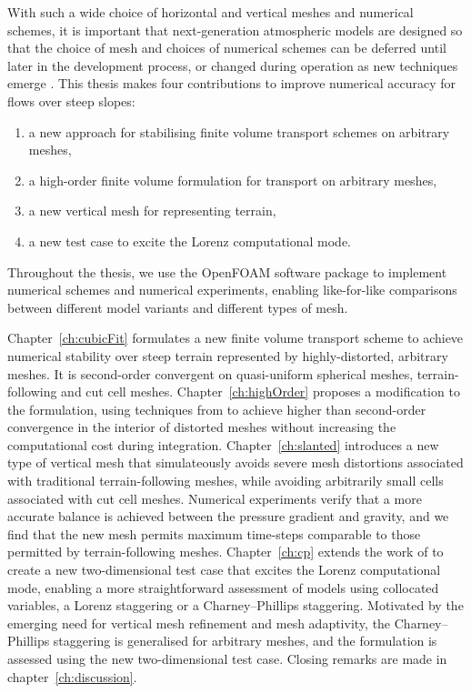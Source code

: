 With such a wide choice of horizontal and vertical meshes and numerical schemes, it is important that next-generation atmospheric models are designed so that the choice of mesh and choices of numerical schemes can be deferred until later in the development process, or changed during operation as new techniques emerge \citep{ford2013, theurich2016}.
This thesis makes four contributions to improve numerical accuracy for flows over steep slopes:
\begin{enumerate}
\item a new approach for stabilising finite volume transport schemes on arbitrary meshes,
\item a high-order finite volume formulation for transport on arbitrary meshes,
\item a new vertical mesh for representing terrain,
\item a new test case to excite the Lorenz computational mode.
\end{enumerate}
Throughout the thesis, we use the OpenFOAM software package  to implement numerical schemes and numerical experiments, enabling like-for-like comparisons between different model variants and different types of mesh.

Chapter~\ref{ch:cubicFit} formulates a new finite volume transport scheme to achieve numerical stability over steep terrain represented by highly-distorted, arbitrary meshes.
It is second-order convergent on quasi-uniform spherical meshes, terrain-following and cut cell meshes.
Chapter~\ref{ch:highOrder} proposes a modification to the formulation, using techniques from \citet{devendran2017}  to achieve higher than second-order convergence in the interior of distorted meshes without increasing the computational cost during integration.
Chapter~\ref{ch:slanted} introduces a new type of vertical mesh that simulateously avoids severe mesh distortions associated with traditional terrain-following meshes, while avoiding arbitrarily small cells associated with cut cell meshes.
Numerical experiments verify that a more accurate balance is achieved between the pressure gradient and gravity, and we find that the new mesh permits maximum time-steps comparable to those permitted by terrain-following meshes.
Chapter~\ref{ch:cp} extends the work of \citep{arakawa-konor1996} to create a new two-dimensional test case that excites the Lorenz computational mode, enabling a more straightforward assessment of models using collocated variables, a Lorenz staggering or a Charney--Phillips staggering.
Motivated by the emerging need for vertical mesh refinement and mesh adaptivity, the Charney--Phillips staggering is generalised for arbitrary meshes, and the formulation is assessed using the new two-dimensional test case.
Closing remarks are made in chapter~\ref{ch:discussion}.

